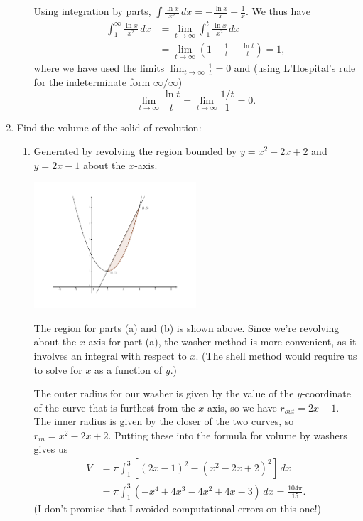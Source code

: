 \documentclass[12pt]{article}
\newcommand{\di}{\displaystyle}
\begin{document}
\begin{enumerate}
\begin{enumerate}
 \medskip
 
 Using integration by parts, $\di\int\frac{\ln x}{x^2}\,dx = -\frac{\ln x}{x}-\frac{1}{x}$. We thus have
\begin{align*}
 \int_1^\infty\frac{\ln x}{x^2}\,dx & = \lim_{t\to\infty}\int_1^t \frac{\ln x}{x^2}\,dx\\
& = \lim_{t\to\infty}\left(1-\frac{1}{t}-\frac{\ln t}{t}\right) = 1,
\end{align*}
where we have used the limits $\di\lim_{t\to\infty}\frac{1}{t} = 0$ and (using L'Hospital's rule for the indeterminate form $\infty/\infty$)
\[
 \lim_{t\to\infty}\frac{\ln t}{t} = \lim_{t\to\infty}\frac{1/t}{1} = 0.
\]
\end{enumerate}

\item Find the volume of the solid of revolution:
\begin{enumerate}
\item Generated by revolving the region bounded by $y=x^2-2x+2$ and $y=2x-1$ about the $x$-axis.

\begin{center}
 \includegraphics[width=0.5\textwidth]{WS7-3a}
\end{center}

The region for parts (a) and (b) is shown above. Since we're revolving about the $x$-axis for part (a), the washer method is more convenient, as it involves an integral with respect to $x$. (The shell method would require us to solve for $x$ as a function of $y$.)

The outer radius for our washer is given by the value of the $y$-coordinate of the curve that is furthest from the $x$-axis, so we have $r_{out} = 2x-1$. The inner radius is given by the closer of the two curves, so $r_{in} = x^2-2x+2$. Putting these into the formula for volume by washers gives us
\begin{align*}
 V & = \pi\int_1^3 \left[(2x-1)^2-(x^2-2x+2)^2\right]\,dx\\
& = \pi\int_1^3 (-x^4+4x^3-4x^2+4x-3)\,dx = \frac{104\pi}{15}.
\end{align*}
(I don't promise that I avoided computational errors on this one!)


\end{enumerate}
\end{enumerate}
\end{document}
